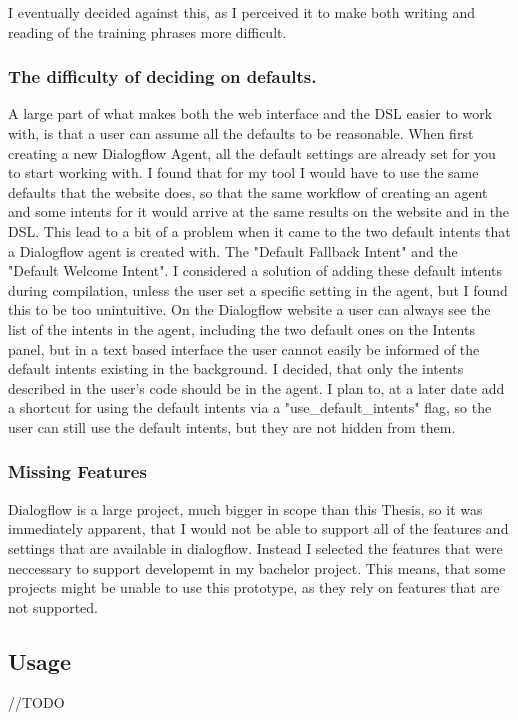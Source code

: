I eventually decided against this, as I perceived it to make both writing and reading of the training phrases more difficult.

\subsubsection{The difficulty of deciding on defaults.}

A large part of what makes both the web interface and the DSL easier to work with, is that a user can assume all the defaults to be reasonable. When first creating a new Dialogflow Agent, all the default settings are already set for you to start working with. I found that for my tool I would have to use the same defaults that the website does, so that the same workflow of creating an agent and some intents for it would arrive at the same results on the website and in the DSL. 
This lead to a bit of a problem when it came to the two default intents that a Dialogflow agent is created with. The "Default Fallback Intent" and the "Default Welcome Intent". 
I considered a solution of adding these default intents during compilation, unless the user set a specific setting in the agent, but I found this to be too unintuitive. On the Dialogflow website a user can always see the list of the intents in the agent, including the two default ones on the Intents panel, but in a text based interface the user cannot easily be informed of the default intents existing in the background. I decided, that only the intents described in the user's code should be in the agent. I plan to, at a later date add a shortcut for using the default intents via a "use\_default\_intents" flag, so the user can still use the default intents, but they are not hidden from them.

\subsubsection{Missing  Features}

Dialogflow is a large project, much bigger in scope than this Thesis, so it was immediately apparent, that I would not be able to support all of the features and settings that are available in dialogflow.
Instead I selected the features that were neccessary to support developemt in my bachelor project.
This means, that some projects might be unable to use this prototype, as they rely on features that are not supported.


\subsection{Usage}
//TODO


